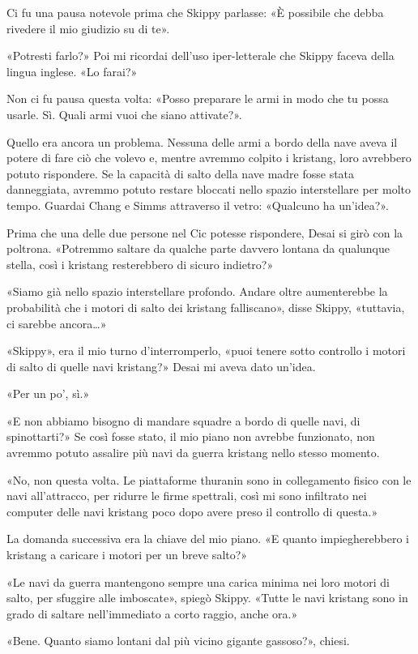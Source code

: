 Ci fu una pausa notevole prima che Skippy parlasse: «È possibile che
debba rivedere il mio giudizio su di te».

«Potresti farlo?» Poi mi ricordai dell'uso iper-letterale che Skippy
faceva della lingua inglese. «Lo farai?»

Non ci fu pausa questa volta: «Posso preparare le armi in modo che tu
possa usarle. Sì. Quali armi vuoi che siano attivate?».

Quello era ancora un problema. Nessuna delle armi a bordo della nave
aveva il potere di fare ciò che volevo e, mentre avremmo colpito i
kristang, loro avrebbero potuto rispondere. Se la capacità di salto
della nave madre fosse stata danneggiata, avremmo potuto restare
bloccati nello spazio interstellare per molto tempo. Guardai Chang e
Simms attraverso il vetro: «Qualcuno ha un'idea?».

Prima che una delle due persone nel Cic potesse rispondere, Desai si
girò con la poltrona. «Potremmo saltare da qualche parte davvero lontana
da qualunque stella, così i kristang resterebbero di sicuro indietro?»

«Siamo già nello spazio interstellare profondo. Andare oltre
aumenterebbe la probabilità che i motori di salto dei kristang
falliscano», disse Skippy, «tuttavia, ci sarebbe ancora\ldots»

«Skippy», era il mio turno d'interromperlo, «puoi tenere sotto controllo
i motori di salto di quelle navi kristang?» Desai mi aveva dato un'idea.

«Per un po', sì.»

«E non abbiamo bisogno di mandare squadre a bordo di quelle navi, di
spinottarti?» Se così fosse stato, il mio piano non avrebbe funzionato,
non avremmo potuto assalire più navi da guerra kristang nello stesso
momento.

«No, non questa volta. Le piattaforme thuranin sono in collegamento
fisico con le navi all'attracco, per ridurre le firme spettrali, così mi
sono infiltrato nei computer delle navi kristang poco dopo avere preso
il controllo di questa.»

La domanda successiva era la chiave del mio piano. «E quanto
impiegherebbero i kristang a caricare i motori per un breve salto?»

«Le navi da guerra mantengono sempre una carica minima nei loro motori
di salto, per sfuggire alle imboscate», spiegò Skippy. «Tutte le navi
kristang sono in grado di saltare nell'immediato a corto raggio, anche
ora.»

«Bene. Quanto siamo lontani dal più vicino gigante gassoso?», chiesi.

